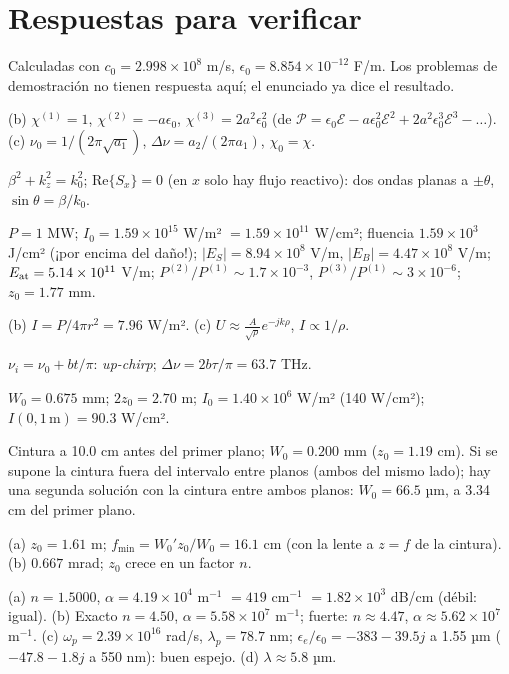 \documentclass[10pt]{article}
\newcounter{prob}
\begin{document}
\section*{Respuestas para verificar}
{\small
Calculadas con $c_0=2.998\times10^8$ m/s, $\epsilon_0=8.854\times10^{-12}$ F/m. Los problemas de demostración no tienen respuesta aquí; el enunciado ya dice el resultado.

\begin{description}[leftmargin=1.2em,itemsep=2pt]
\item[2.] (b) $\chi^{(1)}=1$, $\chi^{(2)}=-a\epsilon_0$, $\chi^{(3)}=2a^2\epsilon_0^2$ (de $\mathcal P=\epsilon_0\mathcal E-a\epsilon_0^2\mathcal E^2+2a^2\epsilon_0^3\mathcal E^3-\dots$). (c) $\nu_0=1/(2\pi\sqrt{a_1})$, $\Delta\nu=a_2/(2\pi a_1)$, $\chi_0=\chi$.
\item[3.] $\beta^2+k_z^2=k_0^2$; $\mathrm{Re}\{S_x\}=0$ (en $x$ solo hay flujo reactivo): dos ondas planas a $\pm\theta$, $\sin\theta=\beta/k_0$.
\item[4.] $P=1$ MW; $I_0=1.59\times10^{15}$ W/m² $=1.59\times10^{11}$ W/cm²; fluencia $1.59\times10^3$ J/cm² (¡por encima del daño!); $|E_S|=8.94\times10^8$ V/m, $|E_B|=4.47\times10^8$ V/m; $E_{\rm at}=5.14\times10^{11}$ V/m; $P^{(2)}/P^{(1)}\sim1.7\times10^{-3}$, $P^{(3)}/P^{(1)}\sim3\times10^{-6}$; $z_0=1.77$ mm.
\item[5.] (b) $I=P/4\pi r^2=7.96$ W/m². (c) $U\approx\frac{A}{\sqrt\rho}e^{-jk\rho}$, $I\propto1/\rho$.
\item[7.] $\nu_i=\nu_0+bt/\pi$: \emph{up-chirp}; $\Delta\nu=2b\tau/\pi=63.7$ THz.
\item[8.] $W_0=0.675$ mm; $2z_0=2.70$ m; $I_0=1.40\times10^6$ W/m² (140 W/cm²); $I(0,1\,\mathrm m)=90.3$ W/cm².
\item[9.] Cintura a 10.0 cm antes del primer plano; $W_0=0.200$ mm ($z_0=1.19$ cm). Si se supone la cintura fuera del intervalo entre planos (ambos del mismo lado); hay una segunda solución con la cintura entre ambos planos: $W_0=66.5$ µm, a 3.34 cm del primer plano.
\item[10.] (a) $z_0=1.61$ m; $f_{\min}=W_0'z_0/W_0=16.1$ cm (con la lente a $z=f$ de la cintura). (b) $0.667$ mrad; $z_0$ crece en un factor $n$.
\item[12.] (a) $n=1.5000$, $\alpha=4.19\times10^4$ m$^{-1}$ $=419$ cm$^{-1}$ $=1.82\times10^3$ dB/cm (débil: igual). (b) Exacto $n=4.50$, $\alpha=5.58\times10^7$ m$^{-1}$; fuerte: $n\approx4.47$, $\alpha\approx5.62\times10^7$ m$^{-1}$. (c) $\omega_p=2.39\times10^{16}$ rad/s, $\lambda_p=78.7$ nm; $\epsilon_e/\epsilon_0=-383-39.5j$ a 1.55 µm ($-47.8-1.8j$ a 550 nm): buen espejo. (d) $\lambda\approx5.8$ µm.

\end{description}}
\end{document}
